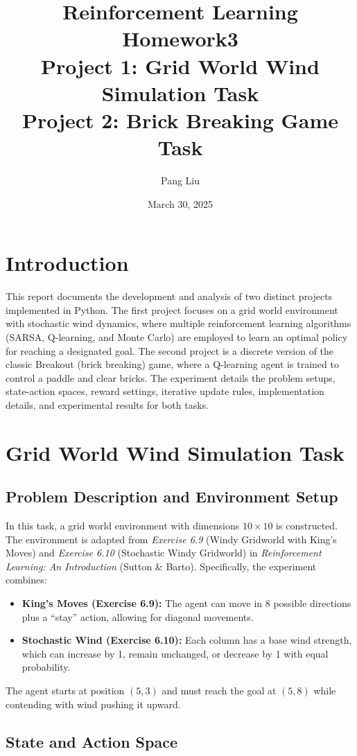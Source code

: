 \documentclass{article}
\title{Reinforcement Learning Homework3\\[0.5em]
\large Project 1: Grid World Wind Simulation Task\\
\large Project 2: Brick Breaking Game Task}
\author{Pang Liu}
\date{March 30, 2025}
\begin{document}
\maketitle

\section{Introduction}
This report documents the development and analysis of two distinct projects implemented in Python. The first project focuses on a grid world environment with stochastic wind dynamics, where multiple reinforcement learning algorithms (SARSA, Q-learning, and Monte Carlo) are employed to learn an optimal policy for reaching a designated goal. The second project is a discrete version of the classic Breakout (brick breaking) game, where a Q-learning agent is trained to control a paddle and clear bricks. The experiment details the problem setups, state-action spaces, reward settings, iterative update rules, implementation details, and experimental results for both tasks.

\section{Grid World Wind Simulation Task}
\subsection{Problem Description and Environment Setup}
In this task, a grid world environment with dimensions $10 \times 10$ is constructed. The environment is adapted from \textit{Exercise 6.9} (Windy Gridworld with King’s Moves) and \textit{Exercise 6.10} (Stochastic Windy Gridworld) in \emph{Reinforcement Learning: An Introduction} (Sutton \& Barto). Specifically, the experiment combines:
\begin{itemize}
    \item \textbf{King’s Moves (Exercise 6.9):} The agent can move in 8 possible directions plus a ``stay'' action, allowing for diagonal movements.
    \item \textbf{Stochastic Wind (Exercise 6.10):} Each column has a base wind strength, which can increase by 1, remain unchanged, or decrease by 1 with equal probability.
\end{itemize}

The agent starts at position $(5,3)$ and must reach the goal at $(5,8)$ while contending with wind pushing it upward.

\subsection{State and Action Space}
\end{document}
